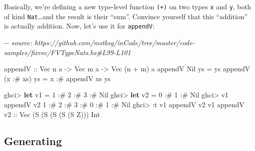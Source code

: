\documentclass[]{article}
\newenvironment{Shaded}{}{}
\newcommand{\CommentTok}[1]{\textcolor[rgb]{0.38,0.63,0.69}{\textit{#1}}}
\newcommand{\DataTypeTok}[1]{\textcolor[rgb]{0.56,0.13,0.00}{#1}}
\newcommand{\DecValTok}[1]{\textcolor[rgb]{0.25,0.63,0.44}{#1}}
\newcommand{\KeywordTok}[1]{\textcolor[rgb]{0.00,0.44,0.13}{\textbf{#1}}}
\newcommand{\NormalTok}[1]{#1}
\newcommand{\OperatorTok}[1]{\textcolor[rgb]{0.40,0.40,0.40}{#1}}
\newcommand{\OtherTok}[1]{\textcolor[rgb]{0.00,0.44,0.13}{#1}}
\begin{document}
Basically, we're defining a new type-level function \texttt{(+)} on two types
\texttt{x} and \texttt{y}, both of kind \texttt{Nat}\ldots and the result is
their ``sum''. Convince yourself that this ``addition'' is actually addition.
Now, let's use it for \texttt{appendV}:

\begin{Shaded}
\begin{Highlighting}[]
\CommentTok{{-}{-} source: https://github.com/mstksg/inCode/tree/master/code{-}samples/fixvec/FVTypeNats.hs\#L99{-}L101}

\OtherTok{appendV ::} \DataTypeTok{Vec}\NormalTok{ n a }\OtherTok{{-}\textgreater{}} \DataTypeTok{Vec}\NormalTok{ m a }\OtherTok{{-}\textgreater{}} \DataTypeTok{Vec}\NormalTok{ (n }\OperatorTok{+}\NormalTok{ m) a}
\NormalTok{appendV }\DataTypeTok{Nil}\NormalTok{       ys }\OtherTok{=}\NormalTok{ ys}
\NormalTok{appendV (x }\OperatorTok{:\#}\NormalTok{ xs) ys }\OtherTok{=}\NormalTok{ x }\OperatorTok{:\#}\NormalTok{ appendV xs ys}
\end{Highlighting}
\end{Shaded}

\begin{Shaded}
\begin{Highlighting}[]
\NormalTok{ghci}\OperatorTok{\textgreater{}} \KeywordTok{let}\NormalTok{ v1 }\OtherTok{=} \DecValTok{1} \OperatorTok{:\#} \DecValTok{2} \OperatorTok{:\#} \DecValTok{3} \OperatorTok{:\#} \DataTypeTok{Nil}
\NormalTok{ghci}\OperatorTok{\textgreater{}} \KeywordTok{let}\NormalTok{ v2 }\OtherTok{=} \DecValTok{0} \OperatorTok{:\#} \DecValTok{1} \OperatorTok{:\#} \DataTypeTok{Nil}
\NormalTok{ghci}\OperatorTok{\textgreater{}}\NormalTok{ v1 }\OtherTok{\textasciigrave{}appendV\textasciigrave{}}\NormalTok{ v2}
\DecValTok{1} \OperatorTok{:\#} \DecValTok{2} \OperatorTok{:\#} \DecValTok{3} \OperatorTok{:\#} \DecValTok{0} \OperatorTok{:\#} \DecValTok{1} \OperatorTok{:\#} \DataTypeTok{Nil}
\NormalTok{ghci}\OperatorTok{\textgreater{}} \OperatorTok{:}\NormalTok{t v1 }\OtherTok{\textasciigrave{}appendV\textasciigrave{}}\NormalTok{ v2}
\NormalTok{v1 }\OtherTok{\textasciigrave{}appendV\textasciigrave{} v2 ::} \DataTypeTok{Vec}\NormalTok{ (}\DataTypeTok{S}\NormalTok{ (}\DataTypeTok{S}\NormalTok{ (}\DataTypeTok{S}\NormalTok{ (}\DataTypeTok{S}\NormalTok{ (}\DataTypeTok{S} \DataTypeTok{Z}\NormalTok{))) }\DataTypeTok{Int}
\end{Highlighting}
\end{Shaded}

\subsection{Generating}\label{generating}
\end{document}
